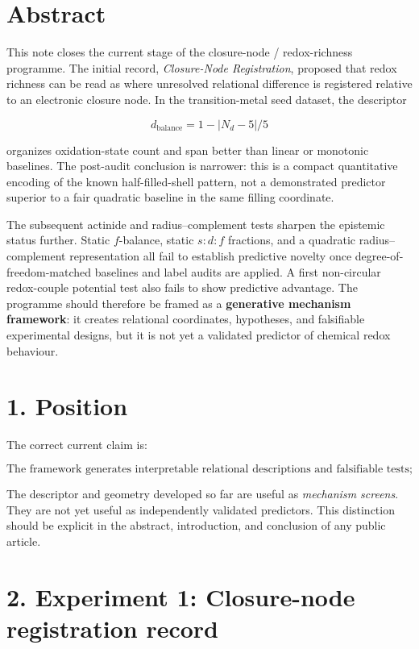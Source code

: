 \section{Abstract}\label{abstract}

This note closes the current stage of the closure-node / redox-richness
programme. The initial record, \emph{Closure-Node Registration},
proposed that redox richness can be read as where unresolved relational
difference is registered relative to an electronic closure node. In the
transition-metal seed dataset, the descriptor

\[
d_{\mathrm{balance}}=1-|N_d-5|/5
\]

organizes oxidation-state count and span better than linear or monotonic
baselines. The post-audit conclusion is narrower: this is a compact
quantitative encoding of the known half-filled-shell pattern, not a
demonstrated predictor superior to a fair quadratic baseline in the same
filling coordinate.

The subsequent actinide and radius--complement tests sharpen the
epistemic status further. Static \(f\)-balance, static \(s:d:f\)
fractions, and a quadratic radius--complement representation all fail to
establish predictive novelty once degree-of-freedom-matched baselines
and label audits are applied. A first non-circular redox-couple
potential test also fails to show predictive advantage. The programme
should therefore be framed as a \textbf{generative mechanism framework}:
it creates relational coordinates, hypotheses, and falsifiable
experimental designs, but it is not yet a validated predictor of
chemical redox behaviour.

\section{1. Position}\label{position}

The correct current claim is:

\[
\boxed{\text{The framework generates interpretable relational descriptions and falsifiable tests; it is not yet a validated predictive model.}}
\]

The descriptor and geometry developed so far are useful as
\emph{mechanism screens}. They are not yet useful as independently
validated predictors. This distinction should be explicit in the
abstract, introduction, and conclusion of any public article.

\section{2. Experiment 1: Closure-node registration
record}\label{experiment-1-closure-node-registration-record}

